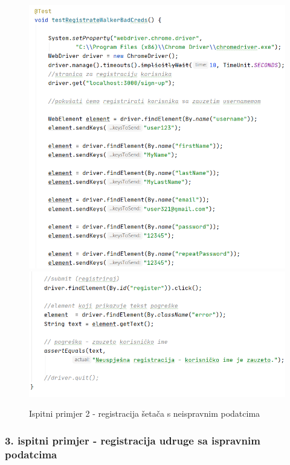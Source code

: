 			 \begin{figure}[H]
			 	\includegraphics[scale=0.75]{slike/Selenium2.1.PNG}
			 	\hspace*{0.15in}
			 	\includegraphics[scale=0.75]{slike/Selenium2.2.PNG}
			 	\caption{Ispitni primjer 2 - registracija šetača s neispravnim podatcima} %
			 	\centering
			 \end{figure}
		 
		 
		   \subsubsection{3. ispitni primjer - registracija udruge sa ispravnim podatcima}
		 
